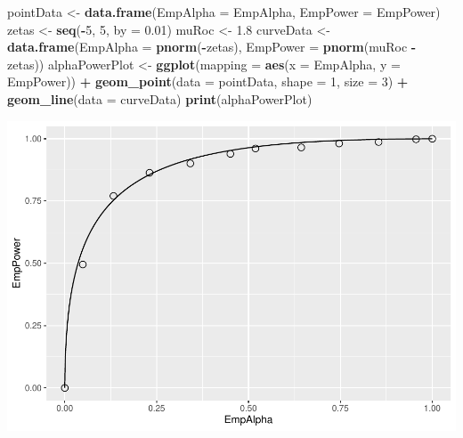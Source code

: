 \documentclass[
]{book}
\newenvironment{Shaded}{\begin{snugshade}}{\end{snugshade}}
\newcommand{\DataTypeTok}[1]{\textcolor[rgb]{0.13,0.29,0.53}{#1}}
\newcommand{\DecValTok}[1]{\textcolor[rgb]{0.00,0.00,0.81}{#1}}
\newcommand{\FloatTok}[1]{\textcolor[rgb]{0.00,0.00,0.81}{#1}}
\newcommand{\KeywordTok}[1]{\textcolor[rgb]{0.13,0.29,0.53}{\textbf{#1}}}
\newcommand{\NormalTok}[1]{#1}
\newcommand{\OperatorTok}[1]{\textcolor[rgb]{0.81,0.36,0.00}{\textbf{#1}}}
\newcommand{\StringTok}[1]{\textcolor[rgb]{0.31,0.60,0.02}{#1}}
\begin{document}
\begin{Shaded}
\begin{Highlighting}[]
\NormalTok{pointData \textless{}{-}}\StringTok{ }\KeywordTok{data.frame}\NormalTok{(}\DataTypeTok{EmpAlpha =}\NormalTok{ EmpAlpha, }\DataTypeTok{EmpPower =}\NormalTok{ EmpPower)}
\NormalTok{zetas \textless{}{-}}\StringTok{ }\KeywordTok{seq}\NormalTok{(}\OperatorTok{{-}}\DecValTok{5}\NormalTok{, }\DecValTok{5}\NormalTok{, }\DataTypeTok{by =} \FloatTok{0.01}\NormalTok{)}
\NormalTok{muRoc \textless{}{-}}\StringTok{ }\FloatTok{1.8}
\NormalTok{curveData \textless{}{-}}\StringTok{ }\KeywordTok{data.frame}\NormalTok{(}\DataTypeTok{EmpAlpha =} \KeywordTok{pnorm}\NormalTok{(}\OperatorTok{{-}}\NormalTok{zetas),}
  \DataTypeTok{EmpPower =} \KeywordTok{pnorm}\NormalTok{(muRoc }\OperatorTok{{-}}\StringTok{ }\NormalTok{zetas))}
\NormalTok{alphaPowerPlot \textless{}{-}}\StringTok{ }\KeywordTok{ggplot}\NormalTok{(}\DataTypeTok{mapping =} \KeywordTok{aes}\NormalTok{(}\DataTypeTok{x =}\NormalTok{ EmpAlpha, }\DataTypeTok{y =}\NormalTok{ EmpPower)) }\OperatorTok{+}\StringTok{ }
\StringTok{  }\KeywordTok{geom\_point}\NormalTok{(}\DataTypeTok{data =}\NormalTok{ pointData, }\DataTypeTok{shape =} \DecValTok{1}\NormalTok{, }\DataTypeTok{size =} \DecValTok{3}\NormalTok{) }\OperatorTok{+}\StringTok{ }
\StringTok{  }\KeywordTok{geom\_line}\NormalTok{(}\DataTypeTok{data =}\NormalTok{ curveData)}
\KeywordTok{print}\NormalTok{(alphaPowerPlot)}
\end{Highlighting}
\end{Shaded}

\includegraphics{08-Hypothesis-Testing_files/figure-latex/unnamed-chunk-7-1.pdf}
\end{document}
